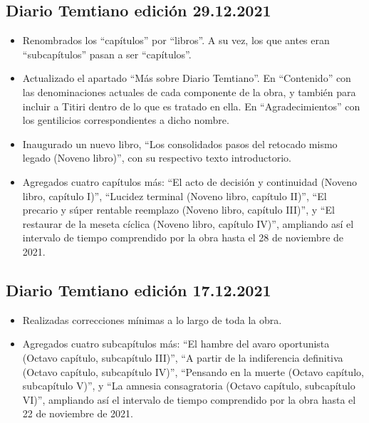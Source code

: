 \documentclass[
]{book}
\begin{document}
\hypertarget{diario-temtiano-ediciuxf3n-29.12.2021}{%
\subsection*{Diario Temtiano edición 29.12.2021}\label{diario-temtiano-ediciuxf3n-29.12.2021}}

\begin{itemize}
\item
  Renombrados los ``capítulos'' por ``libros''. A su vez, los que antes eran ``subcapítulos'' pasan a ser ``capítulos''.
\item
  Actualizado el apartado ``Más sobre Diario Temtiano''. En ``Contenido'' con las denominaciones actuales de cada componente de la obra, y también para incluir a Titiri dentro de lo que es tratado en ella. En ``Agradecimientos'' con los gentilicios correspondientes a dicho nombre.
\item
  Inaugurado un nuevo libro, ``Los consolidados pasos del retocado mismo legado (Noveno libro)'', con su respectivo texto introductorio.
\item
  Agregados cuatro capítulos más: ``El acto de decisión y continuidad (Noveno libro, capítulo I)'', ``Lucidez terminal (Noveno libro, capítulo II)'', ``El precario y súper rentable reemplazo (Noveno libro, capítulo III)'', y ``El restaurar de la meseta cíclica (Noveno libro, capítulo IV)'', ampliando así el intervalo de tiempo comprendido por la obra hasta el 28 de noviembre de 2021.
\end{itemize}

\hypertarget{diario-temtiano-ediciuxf3n-17.12.2021}{%
\subsection*{Diario Temtiano edición 17.12.2021}\label{diario-temtiano-ediciuxf3n-17.12.2021}}

\begin{itemize}
\item
  Realizadas correcciones mínimas a lo largo de toda la obra.
\item
  Agregados cuatro subcapítulos más: ``El hambre del avaro oportunista (Octavo capítulo, subcapítulo III)'', ``A partir de la indiferencia definitiva (Octavo capítulo, subcapítulo IV)'', ``Pensando en la muerte (Octavo capítulo, subcapítulo V)'', y ``La amnesia consagratoria (Octavo capítulo, subcapítulo VI)'', ampliando así el intervalo de tiempo comprendido por la obra hasta el 22 de noviembre de 2021.
\end{itemize}
\end{document}
